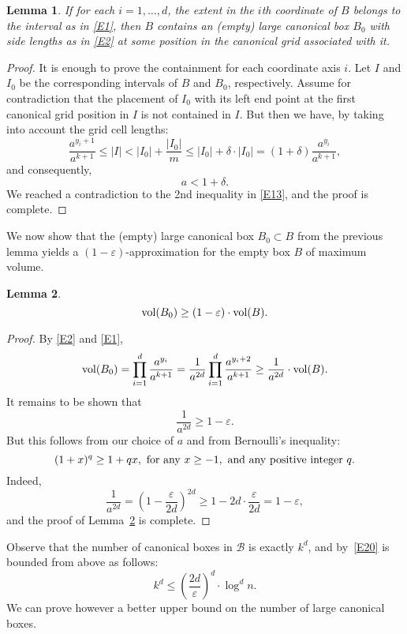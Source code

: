 \documentclass[11pt]{article}
\newtheorem{lemma}{Lemma}
\newcommand{\eps}{\varepsilon}
\def\B{\mathcal B}
\newcommand{\vol}{{\rm vol}}
\begin{document}
\begin{lemma} \label{L7}
If for each $i=1,\ldots,d$, 
the extent in the $i$th coordinate of $B$ belongs to the interval
as in \eqref{E1}, then $B$ contains an (empty) large canonical box
$B_0$ with side lengths as in \eqref{E2} at some position in the
canonical grid associated with it.    
\end{lemma}
\begin{proof}
It is enough to prove the containment for each coordinate axis $i$. 
Let $I$ and $I_0$ be the corresponding intervals of $B$
and $B_0$, respectively.
Assume for contradiction that the placement of $I_0$ with its left end
point at the first canonical grid position in $I$ is not contained in 
$I$. But then we have, by taking into account the grid cell lengths:
$$ \frac{a^{y_i+1}}{a^{k+1}} \leq |I| <
|I_0| + \frac{|I_0|}{m} \leq |I_0| + \delta \cdot |I_0| =
\left(1+\delta \right) \frac{a^{y_i}}{a^{k+1}}, $$
and consequently,
$$ a < 1+\delta. $$
We reached a contradiction to the 2nd inequality in \eqref{E13}, and
the proof is complete. 
\end{proof}

We now show that the (empty) large canonical box $B_0 \subset B$ from the
previous lemma yields a $(1-\eps)$-approximation for the empty box $B$
of maximum volume. 


\begin{lemma} \label{L9}
$$ \vol(B_0) \geq (1-\eps) \cdot \vol(B). $$
\end{lemma}
\begin{proof}
By \eqref{E2} and \eqref{E1}, 
$$ \vol(B_0) = \prod_{i=1}^d \frac{a^{y_i}}{a^{k+1}} =
\frac{1}{a^{2d}} \prod_{i=1}^d \frac{a^{y_i+2}}{a^{k+1}} \geq
\frac{1}{a^{2d}} \cdot \vol(B). $$
It remains to be shown that 
$$ \frac{1}{a^{2d}} \geq 1-\eps. $$
But this follows from our choice of $a$ and from Bernoulli's
inequality: 
$$ (1+x)^q \geq 1+qx, {\rm \ for \ any \ } x \geq -1, 
{\rm \ and \ any \ positive \ integer \ } q. $$
Indeed,
$$ \frac{1}{a^{2d}} = \left(1-\frac{\eps}{2d}\right)^{2d} \geq
1- 2d \cdot \frac{\eps}{2d}= 1-\eps, $$
and the proof of Lemma~\ref{L9} is complete.
\end{proof}


Observe that the number of canonical boxes in $\B$ is exactly $k^d$,
and by~\eqref{E20} is bounded from above as follows:
\begin{equation} \label{E16}
k^d \leq \left(\frac{2d}{\eps} \right)^d \cdot \log^d{n}.
\end{equation}
We can prove however a better upper bound on the number of large canonical
boxes. 
\end{document}
